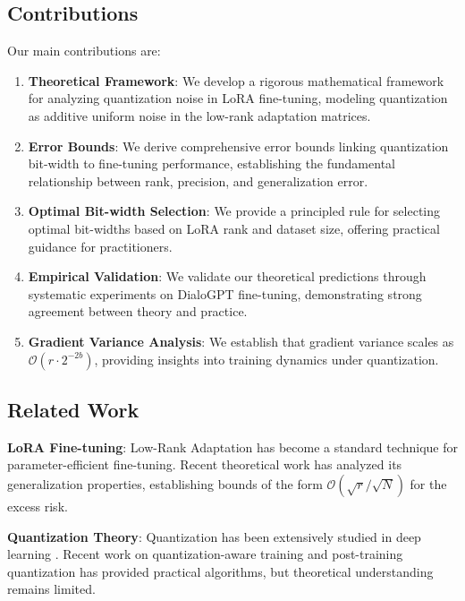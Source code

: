 \documentclass[10pt,twocolumn]{article}
\begin{document}
\subsection{Contributions}

Our main contributions are:

\begin{enumerate}
\item \textbf{Theoretical Framework}: We develop a rigorous mathematical framework for analyzing quantization noise in LoRA fine-tuning, modeling quantization as additive uniform noise in the low-rank adaptation matrices.

\item \textbf{Error Bounds}: We derive comprehensive error bounds linking quantization bit-width to fine-tuning performance, establishing the fundamental relationship between rank, precision, and generalization error.

\item \textbf{Optimal Bit-width Selection}: We provide a principled rule for selecting optimal bit-widths based on LoRA rank and dataset size, offering practical guidance for practitioners.

\item \textbf{Empirical Validation}: We validate our theoretical predictions through systematic experiments on DialoGPT fine-tuning, demonstrating strong agreement between theory and practice.

\item \textbf{Gradient Variance Analysis}: We establish that gradient variance scales as $\mathcal{O}(r \cdot 2^{-2b})$, providing insights into training dynamics under quantization.
\end{enumerate}

\subsection{Related Work}

\textbf{LoRA Fine-tuning}: Low-Rank Adaptation \citep{hu2021lora} has become a standard technique for parameter-efficient fine-tuning. Recent theoretical work \citep{malladi2023kernel, wang2023lora} has analyzed its generalization properties, establishing bounds of the form $\mathcal{O}(\sqrt{r}/\sqrt{N})$ for the excess risk.

\textbf{Quantization Theory}: Quantization has been extensively studied in deep learning \citep{jacob2018quantization, banner2018post}. Recent work on quantization-aware training \citep{esser2019learned} and post-training quantization \citep{nagel2020up} has provided practical algorithms, but theoretical understanding remains limited.
\end{document}
